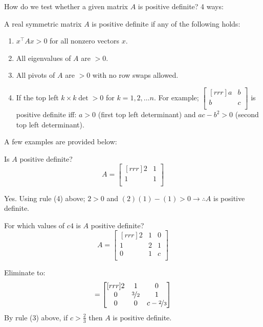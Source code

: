 How do we test whether a given matrix $A$ is positive definite? 4 ways:
\begin{theorem} A real symmetric matrix $A$ is positive definite if any of the following holds:
\begin{enumerate}
    \item $x^\intercal A x > 0$ for all nonzero vectors $x$.
    \item All eigenvalues of $A$ are $> 0$.
    \item All pivots of $A$ are $>0$ with no row swaps allowed.
    \item If the top left $k \times k \det >0$ for $k=1,2, \dots n$.
    \subitem For example; $\begin{bmatrix}[rrr]
     a & b \\
     b & c  \\
 \end{bmatrix}$ is positive definite iff: $a>0$ (first top left determinant) and $ac-b^2>0$ (second top left determinant).
\end{enumerate}
\end{theorem}

A few examples are provided below:

\begin{example}
    Is $A$ positive definite?
    \[A=\begin{bmatrix}[rrr]
     2 & 1 \\
     1 & 1  \\
 \end{bmatrix}\]

 Yes. Using rule (4) above; $2>0$ and $(2)(1)-(1)>0 \rightarrow \therefore A$ is positive definite.

\end{example}

\begin{example}
    For which values of $c4$ is $A$ positive definite?
    \[A=\begin{bmatrix}[rrr]
     2 & 1 & 0 \\
     1 & 2 & 1  \\
     0 & 1 & c  \\
 \end{bmatrix}\]

 Eliminate to:
 \[=\begin{bmatrix}[rrr]
  2 & 1 & 0 \\
  0 & \nicefrac[]{3}{2} & 1  \\
  0 & 0 & c- \nicefrac[]{2}{3}  \\
\end{bmatrix}\]
    By rule (3) above, if $c>\frac{2}{3}$ then $A$ is positive definite.
\end{example}

